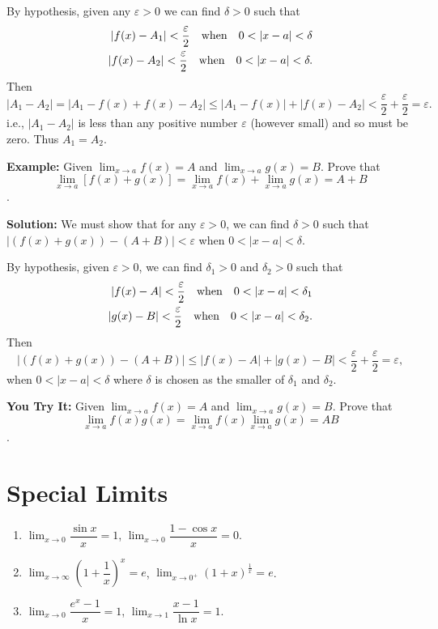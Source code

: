 \documentclass[titlepage,a4paper,12pt]{report}
\begin{document}
\noindent By hypothesis, given any $\varepsilon >0$ we can find $\delta >0$ such that 
\begin{eqnarray*}
|f(x)-A_1|<\frac{\varepsilon}{2} \quad \hbox{when} \quad 0<|x-a|<\delta\\
|f(x)-A_2|<\frac{\varepsilon}{2} \quad \hbox{when} \quad 0<|x-a|<\delta .
\end{eqnarray*}
Then 
\begin{equation*}
|A_1-A_2|=|A_1-f(x)+f(x)-A_2| \leq |A_1-f(x)| +|f(x)-A_2|<\frac{\varepsilon}{2} +\frac{\varepsilon}{2}=\varepsilon .
\end{equation*}
i.e., $|A_1-A_2|$ is less than any positive number $\varepsilon$ (however small) and so must be zero. Thus $A_1=A_2$.

\noindent \textbf{Example:} Given $\displaystyle \lim _{x\rightarrow a} f(x)=A$ and $\displaystyle \lim _{x\rightarrow a} g(x)=B$. Prove that   \[\displaystyle \lim _{x\rightarrow a} [f(x)+ g(x)]=\displaystyle \lim _{x\rightarrow a} f(x) + \displaystyle \lim _{x\rightarrow a} g(x)=A+ B\].

\noindent \textbf{Solution:} We must show that for any $\varepsilon >0$, we can find $\delta >0$ such that $|(f(x)+g(x))-(A+B)|<\varepsilon$ when $0<|x-a|<\delta$. 

\noindent By hypothesis, given $\varepsilon >0$, we can find $\delta _1 >0$ and $\delta _2 >0$ such that 
\begin{eqnarray*}
|f(x)-A|<\frac{\varepsilon}{2} \quad \hbox{when} \quad 0<|x-a|<\delta _1\\
|g(x)-B|<\frac{\varepsilon}{2} \quad \hbox{when} \quad 0<|x-a|<\delta _2 .
\end{eqnarray*}
Then 
\begin{equation*}
|(f(x)+g(x))-(A+B)|\leq |f(x)-A| +|g(x)-B|<\frac{\varepsilon}{2} +\frac{\varepsilon}{2} =\varepsilon , 
\end{equation*} when $0<|x-a|<\delta$ where $\delta$ is chosen as the smaller of $\delta _1$ and $\delta _2$.

\noindent \textbf{You Try It:} Given $\displaystyle \lim _{x\rightarrow a} f(x)=A$ and $\displaystyle \lim _{x\rightarrow a} g(x)=B$. Prove that \[\displaystyle \lim _{x\rightarrow a} f(x)g(x)=\displaystyle \lim _{x\rightarrow a} f(x)\displaystyle \lim _{x\rightarrow a} g(x)=AB\].

\section{Special Limits}
\begin{enumerate}
\item $\displaystyle \lim _{x\rightarrow 0}\dfrac{\sin x}{x}=1$, \quad \quad $\displaystyle \lim _{x\rightarrow 0}\dfrac{1-\cos x}{x}=0$.
\item $\displaystyle \lim _{x\rightarrow \infty}\left(1+\dfrac{1}{x}\right)^x=e$,  \quad \quad $\displaystyle \lim _{x\rightarrow 0^+}(1+x)^{\frac{1}{x}}=e$.
\item $\displaystyle \lim _{x\rightarrow 0}\dfrac{e^x-1}{x}=1$, \quad \quad \quad  $\displaystyle \lim _{x\rightarrow 1}\dfrac{x-1}{\ln x}=1$.
\end{enumerate}
\end{document}
